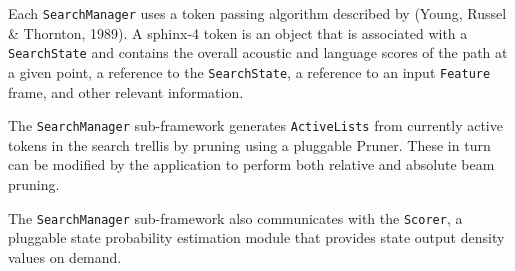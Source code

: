 Each \texttt{SearchManager} uses a token passing algorithm described by (Young, Russel & Thornton, 1989).  A sphinx-4 token is an object that is associated with a \texttt{SearchState} and contains the overall acoustic and language scores of the path at a given point, a reference to the \texttt{SearchState}, a reference to an input \texttt{Feature} frame, and other relevant information.

The \texttt{SearchManager} sub-framework generates \texttt{ActiveLists} from currently active tokens in the search trellis by pruning using a pluggable Pruner. These in turn can be modified by the application to perform both relative and absolute beam pruning.

The \texttt{SearchManager} sub-framework also communicates with the \texttt{Scorer}, a pluggable state probability estimation module that provides state output density values on demand.

